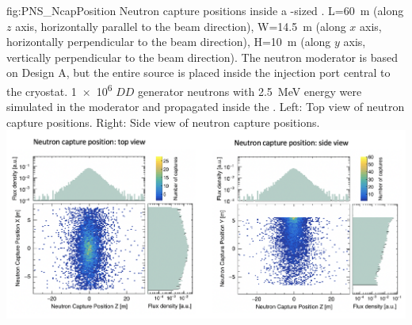 \begin{dunefigure}{fig:PNS_NcapPosition}
{Neutron capture positions inside a -sized . L=\SI{60}{\m} (along $z$ axis, horizontally parallel to the beam direction), W=\SI{14.5}{\m} (along $x$ axis, horizontally perpendicular to the beam direction), H=\SI{10}{\m} (along $y$ axis, vertically perpendicular to the beam direction). The neutron moderator is based on Design A, but the entire source is placed inside the injection port central to the cryostat. \num{1e6} $DD$ generator neutrons with \SI{2.5}{\MeV} energy were simulated in the moderator and propagated inside the . Left: Top view of neutron capture positions. Right: Side view of neutron capture positions.}
\includegraphics[width=18cm]{graphics/PNS_NcapPosition.png}
\end{dunefigure}


